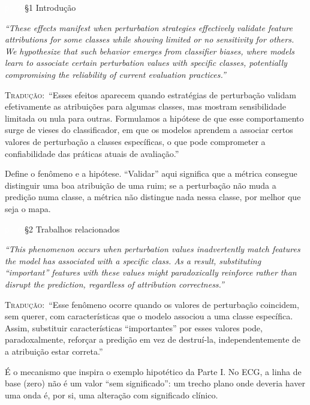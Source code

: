 \documentclass[11pt,a4paper]{article}
\newcommand{\pagechip}[1]{{\setlength{\fboxsep}{1.5pt}\colorbox{cAcc}{\textcolor{white}{\scriptsize\texttt{#1}}}}}
\newenvironment{origquote}{\par\itshape\small}{\par}
\newenvironment{tradquote}{\par\small\textsc{Tradução:}\ }{\par}
\newcommand{\explab}[1]{\par\smallskip{\small\color{cAcc}\textbf{\MakeUppercase{#1}}}\par}
\begin{document}
\begin{citacard}{\pagechip{p. 2} §1 Introdução}
\begin{origquote}“These effects manifest when perturbation strategies effectively validate feature attributions for some classes while showing limited or no sensitivity for others. We hypothesize that such behavior emerges from classifier biases, where models learn to associate certain perturbation values with specific classes, potentially compromising the reliability of current evaluation practices.”\end{origquote}
\begin{tradquote}“Esses efeitos aparecem quando estratégias de perturbação validam efetivamente as atribuições para algumas classes, mas mostram sensibilidade limitada ou nula para outras. Formulamos a hipótese de que esse comportamento surge de vieses do classificador, em que os modelos aprendem a associar certos valores de perturbação a classes específicas, o que pode comprometer a confiabilidade das práticas atuais de avaliação.”\end{tradquote}
\explab{Explicação}
Define o fenômeno e a hipótese. “Validar” aqui significa que a métrica consegue distinguir uma boa atribuição de uma ruim; se a perturbação não muda a predição numa classe, a métrica não distingue nada nessa classe, por melhor que seja o mapa.
\end{citacard}

\begin{citacard}{\pagechip{p. 6} §2 Trabalhos relacionados}
\begin{origquote}“This phenomenon occurs when perturbation values inadvertently match features the model has associated with a specific class. As a result, substituting “important” features with these values might paradoxically reinforce rather than disrupt the prediction, regardless of attribution correctness.”\end{origquote}
\begin{tradquote}“Esse fenômeno ocorre quando os valores de perturbação coincidem, sem querer, com características que o modelo associou a uma classe específica. Assim, substituir características “importantes” por esses valores pode, paradoxalmente, reforçar a predição em vez de destruí-la, independentemente de a atribuição estar correta.”\end{tradquote}
\explab{Explicação}
É o mecanismo que inspira o exemplo hipotético da Parte I. No ECG, a linha de base (zero) não é um valor “sem significado”: um trecho plano onde deveria haver uma onda é, por si, uma alteração com significado clínico.
\end{citacard}
\end{document}
